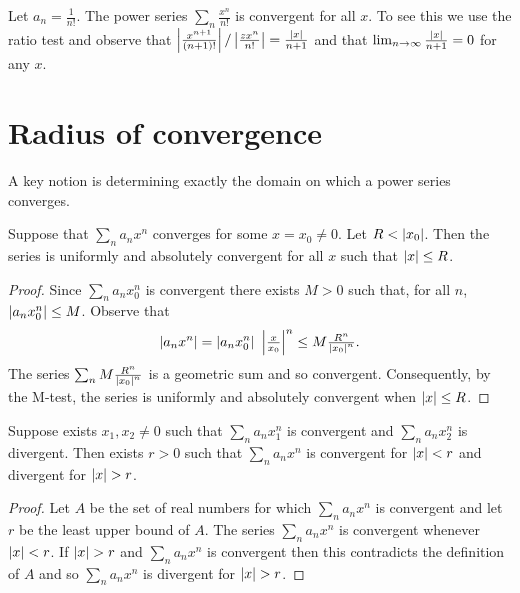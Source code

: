 \begin{example*}
  Let \(a_n = \frac{1}{n!}\).
  The power series \(\sum_{n}\frac{x^n}{n!}\) is convergent for all \(x\).
  To see this we use the ratio test and observe that  \(\left|\frac{x^{n+1}}{(n+1)!} \right|/ \left|\frac{zx^n}{n!}\right| = \frac{\left|x\right|}{n+1}\) and that \(\lim_{n\to\infty} \frac{\left|x\right|}{n+1} = 0 \) for any \(x\).
\end{example*}



\section{Radius of convergence}

A key notion is determining exactly the domain on which a power series converges.

\begin{theorem}
  Suppose that \(\sum_{n}a_n x^n\) converges for some \(x=x_0 \neq 0\).
  Let \(R<\left|x_0\right|\).
  Then the series is uniformly and absolutely convergent for all \(x\) such that \(\left|x\right|\leq R\).
\end{theorem}

\begin{proof}
  Since \(\sum_n a_n x_0^n\) is convergent there exists  \(M>0\) such that, for all \(n\), \(\left|a_n x_0^n\right| \leq M\).
  Observe that
  \[
    \abs{a_n x^n} = \abs{a_n x_0^n} \ \abs{\tfrac{x}{x_0}}^n \leq M \tfrac{R^n}{\abs{x_0}^n}.
  \]
  The series
  \(\sum_n M \frac{R^n}{\left|x_0\right|^n}\) is a geometric sum and so convergent.
  Consequently, by the M-test, the series is uniformly and absolutely convergent when \(\left|x\right|\leq R\).
\end{proof}

\begin{theorem}
  Suppose exists  \(x_1,x_2 \neq 0\) such that \(\sum_n a_n x_1^n\) is convergent and \(\sum_n a_n x_2^n\) is divergent.
  Then exists \(r>0\) such that \(\sum_n a_n x^n\) is convergent for \(\left|x\right|<r\) and divergent for \(\abs{x}>r\).
\end{theorem}

\begin{proof}
  Let \(A\) be the set of real numbers for which \(\sum_n a_n x^n\) is convergent and
  let \(r\) be the least upper bound of \(A\).
  The series  \(\sum_n a_n x^n\) is convergent whenever \(\left|x\right|<r\).
  If \(\abs{x}>r\) and \(\sum_n a_n x^n\) is convergent then this contradicts the definition of \(A\) and so  \(\sum_n a_n x^n\) is divergent for \(\abs{x}>r\).
\end{proof}

